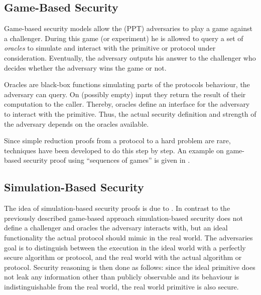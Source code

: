 \subsection{Game-Based Security}
Game-based security models allow the (\ac{PPT}) adversaries to play a game against a challenger.
During this game (or experiment) he is allowed to query a set of \emph{oracles} to simulate and interact with the primitive or protocol under consideration.
Eventually, the adversary outputs his answer to the challenger who decides whether the adversary wins the game or not.

Oracles are black-box functions simulating parts of the protocols behaviour, the adversary can query.
On (possibly empty) input they return the result of their computation to the caller.
Thereby, oracles define an interface for the adversary to interact with the primitive.
Thus, the actual security definition and strength of the adversary depends on the oracles available.

Since simple reduction proofs from a protocol to a hard problem are rare, techniques have been developed to do this step by step.
An example on game-based security proof using ``sequences of games'' is given in \cite{Shoup2004}.

\subsection{Simulation-Based Security}
The idea of simulation-based security proofs is due to \citeauthor{Goldreich87} \cite{Goldreich87} \citeyear{Goldreich87}.
In contrast to the previously described game-based approach simulation-based security does not define a challenger and oracles the adversary interacts with, but an ideal functionality the actual protocol should mimic in the real world.
The adversaries goal is to distinguish between the execution in the ideal world with a perfectly secure algorithm or protocol, and the real world with the actual algorithm or protocol.
Security reasoning is then done as follows: since the ideal primitive does not leak any information other than publicly observable and its behaviour is indistinguishable from the real world, the real world primitive is also secure.

